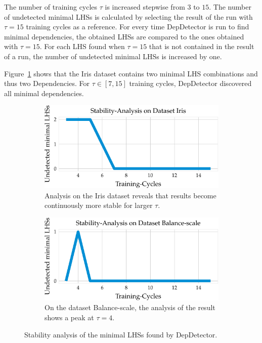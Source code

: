 The number of training cycles \( \tau \) is increased stepwise from \( 3 \text{ to } 15 \).
The number of undetected minimal LHSs is calculated by selecting the result of the run with \( \tau = 15 \) training cycles as a reference.
For every time DepDetector is run to find minimal dependencies, the obtained LHSs are compared to the ones obtained with \( \tau = 15 \).
For each LHS found when \( \tau = 15 \) that is not contained in the result of a run, the number of undetected minimal LHSs is increased by one.

Figure~\ref{fig:dep_detector_lhs_stability_iris} shows that the Iris dataset contains two minimal LHS combinations and thus two Dependencies.
For \( \tau \in [7, 15] \) training cycles, DepDetector discovered all minimal dependencies.
\begin{figure}[ht]
     \centering
     \begin{subfigure}[b]{0.45\textwidth}
         \centering
         \includegraphics[width=\textwidth]{../figures/iris/iris_dep_detector_lhs_stability}
         \caption{Analysis on the Iris dataset reveals that results become continuously more stable for larger \( \tau \).}
         \label{fig:dep_detector_lhs_stability_iris}
     \end{subfigure}
     \hfill
     \begin{subfigure}[b]{0.45\textwidth}
         \centering
         \includegraphics[width=\textwidth]{../figures/balance-scale/balance_scale_dep_detector_lhs_stability.pdf}
         \caption{On the dataset Balance-scale, the analysis of the result shows a peak at \( \tau = 4 \).}
         \label{fig:dep_detector_lhs_stability_balance_scale}
     \end{subfigure}
        \caption{Stability analysis of the minimal LHSs found by DepDetector.}
        \label{fig:stabilit_analysis}
\end{figure}

